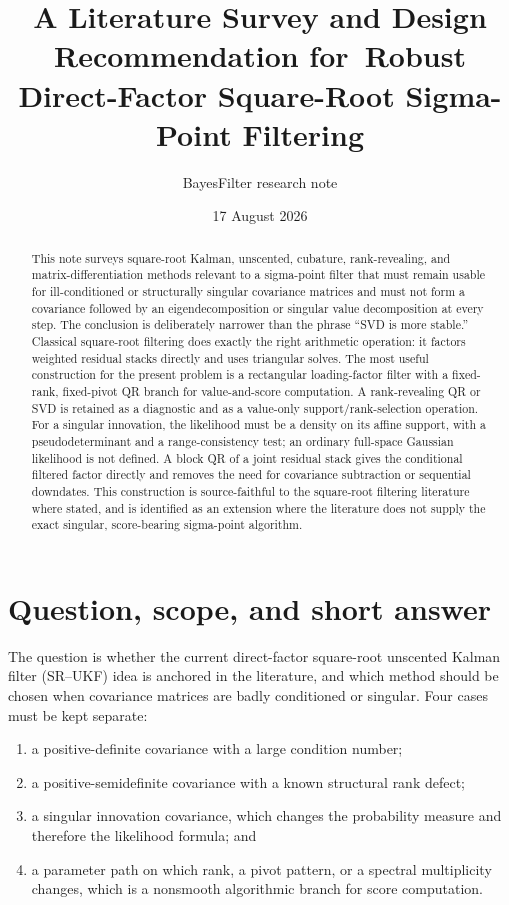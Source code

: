 \documentclass[11pt]{article}
\title{\textbf{A Literature Survey and Design Recommendation for\
Robust Direct-Factor Square-Root Sigma-Point Filtering}}
\author{BayesFilter research note}
\date{17 August 2026}
\begin{document}
\maketitle

\begin{abstract}
This note surveys square-root Kalman, unscented, cubature, rank-revealing, and
matrix-differentiation methods relevant to a sigma-point filter that must remain
usable for ill-conditioned or structurally singular covariance matrices and must
not form a covariance followed by an eigendecomposition or singular value
decomposition at every step.  The conclusion is deliberately narrower than the
phrase ``SVD is more stable.''  Classical square-root filtering does exactly the
right arithmetic operation: it factors weighted residual stacks directly and
uses triangular solves.  The most useful construction for the present problem is
a rectangular loading-factor filter with a fixed-rank, fixed-pivot QR branch for
value-and-score computation.  A rank-revealing QR or SVD is retained as a
diagnostic and as a value-only support/rank-selection operation.  For a
singular innovation, the likelihood must be a density on its affine support,
with a pseudodeterminant and a range-consistency test; an ordinary full-space
Gaussian likelihood is not defined.  A block QR of a joint residual stack gives
the conditional filtered factor directly and removes the need for covariance
subtraction or sequential downdates.  This construction is source-faithful to
the square-root filtering literature where stated, and is identified as an
extension where the literature does not supply the exact singular,
score-bearing sigma-point algorithm.
\end{abstract}

\tableofcontents

\section{Question, scope, and short answer}

The question is whether the current direct-factor square-root unscented Kalman
filter (SR--UKF) idea is anchored in the literature, and which method should be
chosen when covariance matrices are badly conditioned or singular.  Four cases
must be kept separate:
\begin{enumerate}[label=(\roman*)]
  \item a positive-definite covariance with a large condition number;
  \item a positive-semidefinite covariance with a known structural rank defect;
  \item a singular innovation covariance, which changes the probability measure
        and therefore the likelihood formula; and
  \item a parameter path on which rank, a pivot pattern, or a spectral
        multiplicity changes, which is a nonsmooth algorithmic branch for score
        computation.
\end{enumerate}
\end{document}
